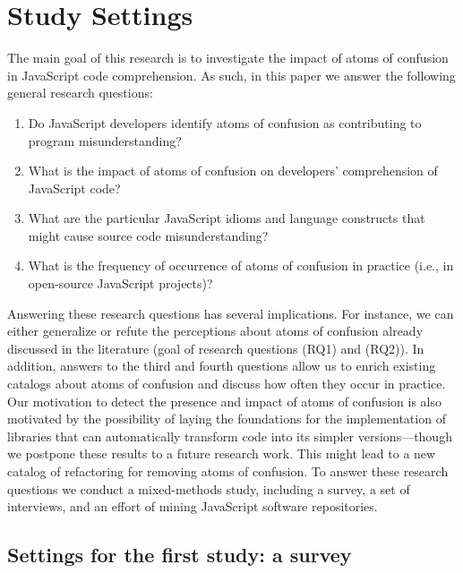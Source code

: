 \section{Study Settings}
\label{method}

The main goal of this research is to investigate the impact of atoms of confusion in JavaScript code comprehension. As such, in this paper we answer the following general research questions: 

\begin{enumerate}[(RQ1)]
    \item Do JavaScript developers identify atoms of confusion as contributing to program misunderstanding? 
    \item What is the impact of atoms of confusion on developers' comprehension of JavaScript code? 
    \item What are the particular JavaScript idioms and language constructs that might cause source code misunderstanding?
    \item What is the frequency of occurrence of atoms of confusion in practice (i.e., in open-source JavaScript projects)?
\end{enumerate}

 
Answering these research questions has several implications. For instance, we can either generalize or refute the perceptions about atoms of confusion already discussed in the literature (goal of research questions (RQ1) and (RQ2)). In addition, answers to the third and fourth questions allow us to enrich existing catalogs about atoms of confusion and discuss how often they occur in practice. Our motivation to detect the presence and impact of atoms of confusion is also motivated by the possibility of laying the foundations for the implementation of libraries that can automatically transform code into its simpler versions---though we postpone these results to a future research work. This might lead to a new catalog of refactoring for removing atoms of confusion.  To answer these research questions we conduct a mixed-methods study, including a survey, a set of interviews, and an effort of mining JavaScript software repositories.  


 \subsection{Settings for the first study: a survey}\label{sec:survey-settings}

